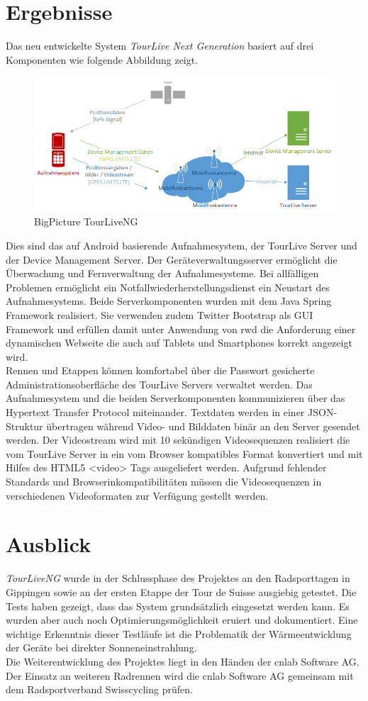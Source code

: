 \section*{Ergebnisse}
Das neu entwickelte System \textit{TourLive Next Generation} basiert auf drei Komponenten wie folgende Abbildung zeigt. 
\begin{figure}[H]
	\centering
	\includegraphics[width=140mm]{images/android/BigPicture_AndroidClient.png} 
	\caption{BigPicture TourLiveNG}
\end{figure}
Dies sind das auf Android basierende Aufnahmesystem, der TourLive Server und der Device Management Server. Der Geräteverwaltungsserver ermöglicht die Überwachung und Fernverwaltung der Aufnahmesysteme. Bei allfälligen Problemen ermöglicht ein Notfallwiederherstellungsdienst ein Neustart des Aufnahmesystems. Beide Serverkomponenten wurden mit dem Java Spring Framework realisiert. Sie verwenden zudem Twitter Bootstrap als GUI Framework und erfüllen damit unter Anwendung von \gls{rwd} die Anforderung einer dynamischen Webseite die auch auf Tablets und Smartphones korrekt angezeigt wird. 
\\

Rennen und Etappen können komfortabel über die Passwort gesicherte Administrationsoberfläche des TourLive Servers verwaltet werden. Das Aufnahmesystem und die beiden Serverkomponenten kommunizieren über das Hypertext Transfer Protocol miteinander. Textdaten werden in einer JSON-Struktur übertragen während Video- und Bilddaten binär an den Server gesendet  werden. Der Videostream wird mit 10 sekündigen Videosequenzen realisiert die vom TourLive Server in ein vom Browser kompatibles Format konvertiert und mit Hilfes des HTML5 <video> Tags ausgeliefert werden. Aufgrund fehlender Standards und Browserinkompatibilitäten müssen die Videosequenzen in verschiedenen Videoformaten zur Verfügung gestellt werden.


\section*{Ausblick}
\textit{TourLiveNG} wurde in der Schlussphase des Projektes an den Radsporttagen in Gippingen sowie an der ersten Etappe der Tour de Suisse ausgiebig getestet. Die Tests haben gezeigt, dass das System grundsätzlich eingesetzt werden kann. Es wurden aber auch noch Optimierungsmöglichkeit eruiert und dokumentiert. Eine wichtige Erkenntnis dieser Testläufe ist die Problematik der Wärmeentwicklung der Geräte bei direkter Sonneneinstrahlung.
\\

Die Weiterentwicklung des Projektes liegt in den Händen der cnlab Software AG. Der Einsatz an weiteren Radrennen wird die cnlab Software AG gemeinsam mit dem Radsportverband Swisscycling prüfen.

